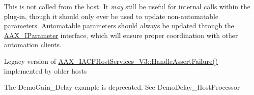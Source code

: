 \begin{DoxyRefList}
\item[\label{a00387__deprecated000013}%
\hypertarget{a00387__deprecated000013}{}%
Member \hyperlink{a00061_a54403bec090fcc999a93f54c01bca0c9}{A\+A\+X\+\_\+\+I\+A\+C\+F\+Effect\+Parameters\+:\+:Update\+Parameter\+Normalized\+Relative} (A\+A\+X\+\_\+\+C\+Param\+I\+D i\+Parameter\+I\+D, double i\+Value)=0]This is not called from the host. It {\itshape may} still be useful for internal calls within the plug-\/in, though it should only ever be used to update non-\/automatable parameters. Automatable parameters should always be updated through the \hyperlink{a00108}{A\+A\+X\+\_\+\+I\+Parameter} interface, which will ensure proper coordination with other automation clients. 
\item[\label{a00387__deprecated000014}%
\hypertarget{a00387__deprecated000014}{}%
Member \hyperlink{a00071_a49111de18abd12b671ae16138e244af3}{A\+A\+X\+\_\+\+I\+A\+C\+F\+Host\+Services\+:\+:Assert} (const char $\ast$i\+File, int32\+\_\+t i\+Line, const char $\ast$i\+Note)=0]Legacy version of \hyperlink{a00073_aaaddbd89dd3d6dd2e9e9def5b99c579f}{A\+A\+X\+\_\+\+I\+A\+C\+F\+Host\+Services\+\_\+\+V3\+::\+Handle\+Assert\+Failure()} implemented by older hosts 
\item[\label{a00387__deprecated000001}%
\hypertarget{a00387__deprecated000001}{}%
Module \hyperlink{a00376}{Example\+Plug\+Ins} ]The Demo\+Gain\+\_\+\+Delay example is deprecated. See Demo\+Delay\+\_\+\+Host\+Processor
\end{DoxyRefList}